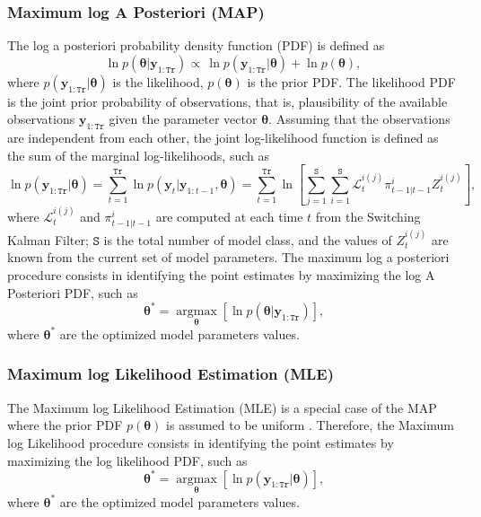 \subsubsection{Maximum log A Posteriori (MAP)}

The log a posteriori probability density function (PDF) is defined as
\begin{equation}
\ln p(\bm\theta|\mathbf{y}_{1:\mathtt{Tr}})  \propto \, \ln p(\mathbf{y}_{1:\mathtt{Tr}}|\bm\theta) + \ln p(\bm\theta),
\label{EQ:BT}
\end{equation} 
where $p(\mathbf{y}_{1:\mathtt{Tr}}|\bm\theta)$ is the likelihood,  $p(\bm\theta)$ is the prior PDF.
The likelihood PDF is the joint prior probability of observations, that is, plausibility of the available observations $\mathbf{y}_{1:\mathtt{Tr}}$ given the parameter vector $\bm\theta$.  
Assuming that the observations are independent from each other, the joint log-likelihood function is defined as the sum of the marginal log-likelihoods, such as 
\begin{equation}
\ln p(\mathbf{y}_{1:\mathtt{Tr}}|\bm\theta)  = \displaystyle\sum_{t=1}^{\mathtt{Tr}} \ln p(\mathbf{y}_{t}|\mathbf{y}_{1:t-1},\bm \theta) = \displaystyle\sum_{t=1}^{\mathtt{Tr}} \ln \left[ \sum_{j=1}^{\mathtt{S}} \sum_{i=1}^{\mathtt{S}} \mathcal{L}_{t}^{i(j)} \pi_{t-1|t-1}^{i} Z_{t}^{i(j)} \right] \text{,}
\label{EQ:LP}
\end{equation}
where $\mathcal{L}_{t}^{i(j)}$ and  $\pi_{t-1|t-1}^{i}$ are computed at each time $t$ from the Switching Kalman Filter; $\mathtt{S}$ is the total number of model class, and the values of $Z_{t}^{i(j)}$ are known from the current set of model parameters.
The maximum log a posteriori procedure consists in identifying the point estimates by maximizing the log A Posteriori PDF, such as
\begin{equation*}
\bm\theta^{*} = \underset{\bm\theta}{\text{arg}\max}\left[\ln p(\bm\theta|\mathbf{y}_{1:\mathtt{Tr}}) \right] \text{,}
\end{equation*}
where $\bm\theta^{*}$ are the optimized model parameters values.

\subsubsection{Maximum log Likelihood Estimation (MLE)}

The Maximum log Likelihood Estimation (MLE) is a special case of the MAP where the prior PDF $p(\bm\theta)$ is assumed to be uniform \cite{gelman2014bayesian}.
Therefore, the Maximum log Likelihood procedure consists in identifying the point estimates by maximizing the log likelihood PDF, such as
\begin{equation*}
\bm\theta^{*} = \underset{\bm\theta}{\text{arg}\max}\left[\ln  p(\mathbf{y}_{1:\mathtt{Tr}}|\bm\theta) \right] \text{,}
\end{equation*}
where $\bm\theta^{*}$ are the optimized model parameters values.


